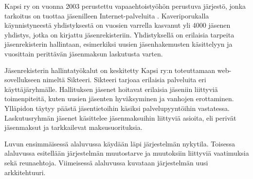 Kapsi ry on vuonna 2003 perustettu vapaaehtoistyöhön perustuva järjestö, jonka tarkoitus on tuottaa jäsenilleen Internet-palveluita \cite{kapsifi}. Kaveriporukalla käynnistyneestä yhdistyksestä on vuosien varrella kasvanut yli 4000 jäsenen yhdistys, jotka on kirjattu jäsenrekisteriin. Yhdistyksellä on erilaisia tarpeita jäsenrekisterin hallintaan, esimerkiksi uusien jäsenhakemusten käsittelyyn ja vuosittain perittävän jäsenmaksun laskutusta varten.

Jäsenrekisterin hallintatyökalut on keskitetty Kapsi ry:n toteuttamaan web-so\-vel\-luk\-seen nimeltä Sikteeri. Sikteeri tarjoaa erilaisia palveluita eri käyttäjäryhmälle. Hallituksen jäsenet hoitavat erilaisia jäseniin liittyviä toimenpiteitä, kuten uusien jäsenten hyväksyminen ja vanhojen erottaminen. Ylläpidon täytyy päästä jäsentietoihin käsiksi palvelupyyntöihin vastatessa. Laskutusryhmän jäsenet käsittelee jäsenmaksuihin liittyviä asioita, eli perivät jäsenmaksut ja tarkkailevat maksusuorituksia.

Luvun ensimmäisessä alaluvussa käydään läpi järjestelmän nykytila. Toisessa alaluvussa esitellään järjestelmän muutostarve ja muutoksiin liittyviä vaatimuksia sekä reunaehtoja. Viimeisessä alaluvussa kuvataan järjestelmän uusi arkkitehtuuri.